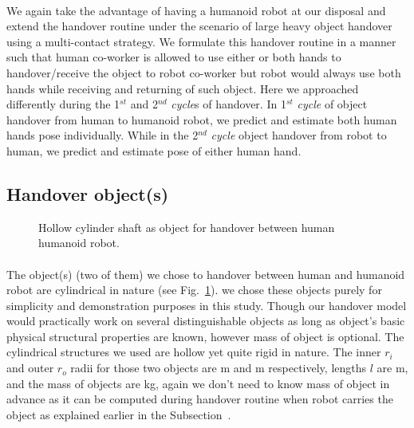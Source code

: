 \documentclass[a4paper, 12pt, oneside]{Thesis}  %
\begin{document}
\paragraph*{}
We again take the advantage of having a humanoid robot at our disposal and extend the handover routine under the scenario of large heavy object handover using a multi-contact strategy. We formulate this handover routine in a manner such that human co-worker is allowed to use either or both hands to handover/receive the object to robot co-worker but robot would always use both hands while receiving and returning of such object. Here we approached differently during the 1${}^{st}$ and 2${}^{nd}$ \textit{cycle}s of handover. In 1${}^{st}$ \textit{cycle} of object handover from human to humanoid robot, we predict and estimate both human hands pose individually.
While in the 2${}^{nd}$ \textit{cycle} object handover from robot to human, we predict and estimate pose of either human hand.


\subsection{Handover object(s)}


\begin{figure}[hpt]
	\caption{Hollow cylinder shaft as object for handover between human humanoid robot.}
	\label{fig:pipe_ex}
\end{figure}

\paragraph*{}
The object(s) (two of them) we chose to handover between human and humanoid robot are cylindrical in nature (see Fig.~\ref{fig:pipe_ex}). we chose these objects purely for simplicity and demonstration purposes in this study. Though our handover model would practically work on several distinguishable objects as long as object's basic physical structural properties are known, however mass of object is optional. The cylindrical structures we used are hollow yet quite rigid in nature. The inner $r_i$ and outer $r_o$ radii for those two objects are  m and  m respectively, lengths $l$ are  m, and the mass of objects are  kg, again we don't need to know mass of object in advance as it can be computed during handover routine when robot carries the object as explained earlier in the Subsection~. 
\end{document}
